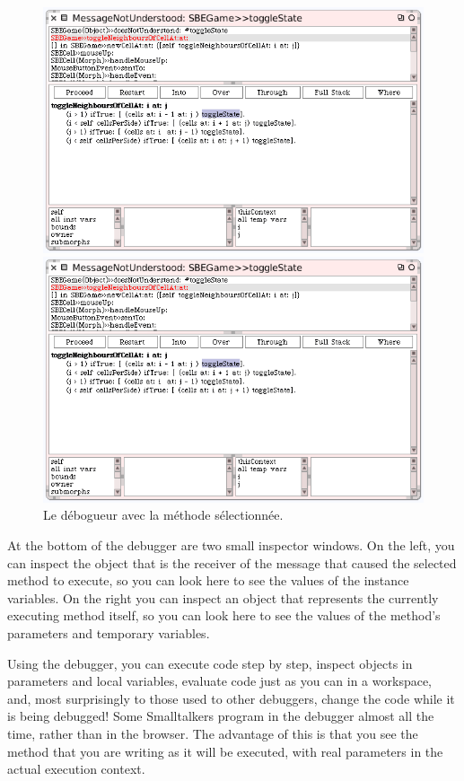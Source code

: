 \documentclass[a4paper,10pt,twoside]{book}
\begin{document}
\begin{figure}[ht]
\ifluluelse
	{\centerline {\includegraphics[width=\textwidth]{Debugger}}}
	{\centerline {\includegraphics[scale=0.7]{Debugger}}}
\caption{Le débogueur avec la méthode  sélectionnée.
\label{fig:debugToggle}}
\end{figure}

At the bottom of the debugger are two small inspector windows.  On the left, you can inspect the object that is the receiver of the message that caused the selected method to execute, so you can look here to see the values of the instance variables.
On the right you can inspect an object that represents the currently executing method itself, so you can look here to see the values of the method's parameters and temporary variables.

Using the debugger, you can execute code step by step, inspect objects in parameters and local variables, evaluate code just as you can in a workspace, and, most surprisingly to those used to other debuggers, change the code while it is being debugged! Some Smalltalkers program in the debugger almost all the time, rather than in the browser.  The advantage of this is that you see the method that you are writing as it will be executed, with real parameters in the actual execution context.
\end{document}
